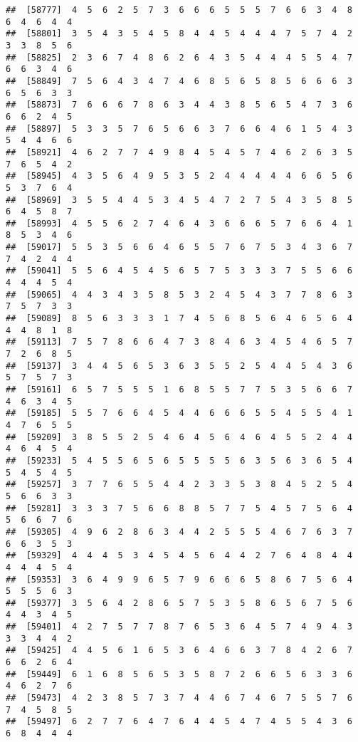 \documentclass[
]{book}
\begin{document}
\begin{verbatim}
##  [58777]  4  5  6  2  5  7  3  6  6  6  5  5  5  7  6  6  3  4  8  6  4  6  4  4
##  [58801]  3  5  4  3  5  4  5  8  4  4  5  4  4  4  7  5  7  4  2  3  3  8  5  6
##  [58825]  2  3  6  7  4  8  6  2  6  4  3  5  4  4  4  5  5  4  7  6  6  3  4  6
##  [58849]  7  5  6  4  3  4  7  4  6  8  5  6  5  8  5  6  6  6  3  6  5  6  3  3
##  [58873]  7  6  6  6  7  8  6  3  4  4  3  8  5  6  5  4  7  3  6  6  6  2  4  5
##  [58897]  5  3  3  5  7  6  5  6  6  3  7  6  6  4  6  1  5  4  3  5  4  4  6  6
##  [58921]  4  6  2  7  7  4  9  8  4  5  4  5  7  4  6  2  6  3  5  7  6  5  4  2
##  [58945]  4  3  5  6  4  9  5  3  5  2  4  4  4  4  4  6  6  5  6  5  3  7  6  4
##  [58969]  3  5  5  4  4  5  3  4  5  4  7  2  7  5  4  3  5  8  5  6  4  5  8  7
##  [58993]  4  5  5  6  2  7  4  6  4  3  6  6  6  5  7  6  6  4  1  8  5  3  4  6
##  [59017]  5  5  3  5  6  6  4  6  5  5  7  6  7  5  3  4  3  6  7  7  4  2  4  4
##  [59041]  5  5  6  4  5  4  5  6  5  7  5  3  3  3  7  5  5  6  6  4  4  4  5  4
##  [59065]  4  4  3  4  3  5  8  5  3  2  4  5  4  3  7  7  8  6  3  7  5  7  3  3
##  [59089]  8  5  6  3  3  3  1  7  4  5  6  8  5  6  4  6  5  6  4  4  4  8  1  8
##  [59113]  7  5  7  8  6  6  4  7  3  8  4  6  3  4  5  4  6  5  7  7  2  6  8  5
##  [59137]  3  4  4  5  6  5  3  6  3  5  5  2  5  4  4  5  4  3  6  5  7  5  7  3
##  [59161]  6  5  7  5  5  5  1  6  8  5  5  7  7  5  3  5  6  6  7  4  6  3  4  5
##  [59185]  5  5  7  6  6  4  5  4  4  6  6  6  5  5  4  5  5  4  1  4  7  6  5  5
##  [59209]  3  8  5  5  2  5  4  6  4  5  6  4  6  4  5  5  2  4  4  4  6  4  5  4
##  [59233]  5  4  5  5  6  5  6  5  5  5  5  6  3  5  6  3  6  5  4  5  4  5  4  5
##  [59257]  3  7  7  6  5  5  4  4  2  3  3  5  3  8  4  5  2  5  4  5  6  6  3  3
##  [59281]  3  3  3  7  5  6  6  8  8  5  7  7  5  4  5  7  5  6  4  5  6  6  7  6
##  [59305]  4  9  6  2  8  6  3  4  4  2  5  5  5  4  6  7  6  3  7  6  6  3  5  3
##  [59329]  4  4  4  5  3  4  5  4  5  6  4  4  2  7  6  4  8  4  4  4  4  4  5  4
##  [59353]  3  6  4  9  9  6  5  7  9  6  6  6  5  8  6  7  5  6  4  5  5  5  6  3
##  [59377]  3  5  6  4  2  8  6  5  7  5  3  5  8  6  5  6  7  5  6  4  4  3  4  5
##  [59401]  4  2  7  5  7  7  8  7  6  5  3  6  4  5  7  4  9  4  3  3  3  4  4  2
##  [59425]  4  4  5  6  1  6  5  3  6  4  6  6  3  7  8  4  2  6  7  6  6  2  6  4
##  [59449]  6  1  6  8  5  6  5  3  5  8  7  2  6  6  5  6  3  3  6  4  6  2  7  6
##  [59473]  4  2  3  8  5  7  3  7  4  4  6  7  4  6  7  5  5  7  6  7  4  5  8  5
##  [59497]  6  2  7  7  6  4  7  6  4  4  5  4  7  4  5  5  4  3  6  6  8  4  4  4

\end{verbatim}
\end{document}
